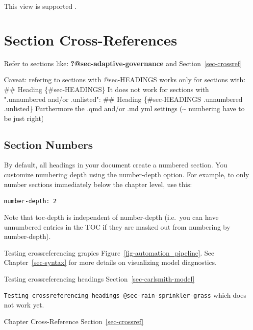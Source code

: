 \documentclass[
  11pt,
  letterpaper,
]{book}
\newenvironment{Shaded}{\begin{snugshade}}{\end{snugshade}}
\newcommand{\AnnotationTok}[1]{\textcolor[rgb]{0.37,0.37,0.37}{#1}}
\newcommand{\CommentTok}[1]{\textcolor[rgb]{0.37,0.37,0.37}{#1}}
\newcommand{\FunctionTok}[1]{\textcolor[rgb]{0.28,0.35,0.67}{#1}}
\newcommand{\NormalTok}[1]{\textcolor[rgb]{0.00,0.23,0.31}{#1}}
\begin{document}
This view is supported \autocites[23]{soares2014}[156-159]{knuth1984}.

\section*{Section Cross-References}\label{sec-crossref}


Refer to sections like: \textbf{?@sec-adaptive-governance} and
Section~\ref{sec-crossref}

\begin{Shaded}
\begin{Highlighting}[]
\AnnotationTok{Caveat:}\CommentTok{ refering to sections with @sec{-}HEADINGS works only for sections with:}
\FunctionTok{\#\# Heading \{\#sec{-}HEADINGS\}}
\NormalTok{It does not work for sections with ".unnumbered and/or .unlisted":}
\FunctionTok{\#\# Heading \{\#sec{-}HEADINGS .unnumbered .unlisted\}}
\NormalTok{Furthermore the .qmd and/or .md yml settings (\textasciitilde{} numbering have to be just right)}
\end{Highlighting}
\end{Shaded}

\subsection*{Section Numbers}\label{section-numbers}

By default, all headings in your document create a numbered section. You
customize numbering depth using the number-depth option. For example, to
only number sections immediately below the chapter level, use this:

\texttt{number-depth:\ 2}

Note that toc-depth is independent of number-depth (i.e.~you can have
unnumbered entries in the TOC if they are masked out from numbering by
number-depth).

Testing crossreferencing grapics Figure~\ref{fig-automation_pipeline}.
See Chapter~\ref{sec-syntax} for more details on visualizing model
diagnostics.

Testing crossreferencing headings Section~\ref{sec-carlsmith-model}

\texttt{Testing\ crossreferencing\ headings\ @sec-rain-sprinkler-grass}
which does not work yet.

Chapter Cross-Reference Section~\ref{sec-crossref}
\end{document}
